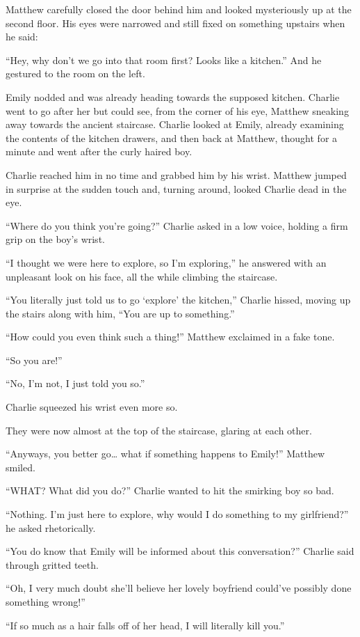Matthew carefully closed the door behind him and looked mysteriously up at the second floor. His eyes were narrowed and still fixed on something upstairs when he said:

“Hey, why don't we go into that room first? Looks like a kitchen.” And he gestured to the room on the left.

Emily nodded and was already heading towards the supposed kitchen. Charlie went to go after her but could see, from the corner of his eye, Matthew sneaking away towards the ancient staircase. Charlie looked at Emily, already examining the contents of the kitchen drawers, and then back at Matthew, thought for a minute and went after the curly haired boy.

Charlie reached him in no time and grabbed him by his wrist. Matthew jumped in surprise at the sudden touch and, turning around, looked Charlie dead in the eye.

“Where do you think you're going?” Charlie asked in a low voice, holding a firm grip on the boy's wrist.

“I thought we were here to explore, so I'm exploring,” he answered with an unpleasant look on his face, all the while climbing the staircase.

“You literally just told us to go ‘explore' the kitchen,” Charlie hissed, moving up the stairs along with him, “You are up to something.”

“How could you even think such a thing!” Matthew exclaimed in a fake tone.

“So you are!”

“No, I'm not, I just told you so.”

Charlie squeezed his wrist even more so.

They were now almost at the top of the staircase, glaring at each other.

“Anyways, you better go… what if something happens to Emily!” Matthew smiled.

“WHAT? What did you do?” Charlie wanted to hit the smirking boy so bad.

“Nothing. I'm just here to explore, why would I do something to my girlfriend?” he asked rhetorically.

“You do know that Emily will be informed about this conversation?” Charlie said through gritted teeth.

“Oh, I very much doubt she'll believe her lovely boyfriend could've possibly done something wrong!”

“If so much as a hair falls off of her head, I will literally kill you.”

